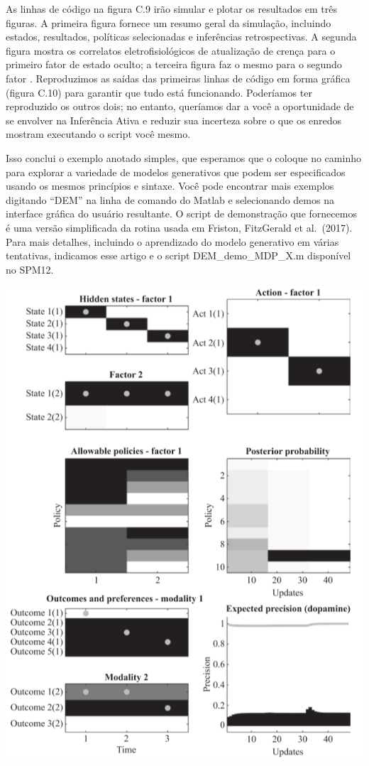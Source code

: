 \documentclass[
  12pt,
]{book}
\begin{document}
As linhas de código na figura C.9 irão simular e plotar os resultados em três figuras. A primeira figura fornece um resumo geral da simulação, incluindo estados, resultados, políticas selecionadas e inferências retrospectivas. A segunda figura mostra os correlatos eletrofisiológicos de atualização de crença para o primeiro fator de estado oculto; a terceira figura faz o mesmo para o segundo fator
. Reproduzimos as saídas das primeiras linhas de código em forma gráfica (figura C.10) para garantir que tudo está funcionando. Poderíamos ter reproduzido os outros dois; no entanto, queríamos dar a você a oportunidade de se envolver na Inferência Ativa e reduzir sua incerteza sobre o que os enredos mostram executando o script você mesmo.

Isso conclui o exemplo anotado simples, que esperamos que o coloque no caminho para explorar a variedade de modelos generativos que podem ser especificados usando os mesmos princípios e sintaxe. Você pode encontrar mais exemplos digitando ``DEM'' na linha de comando do Matlab e selecionando demos na interface gráfica do usuário resultante. O script de demonstração que fornecemos é uma versão simplificada da rotina usada em Friston, FitzGerald et al.~(2017). Para mais detalhes, incluindo o aprendizado do modelo generativo em várias tentativas, indicamos esse artigo e o script DEM\_demo\_MDP\_X.m disponível no SPM12.

\includegraphics{images/Figura_C10.png}
\end{document}
